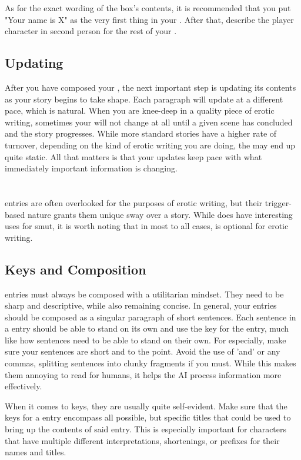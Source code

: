 ﻿\documentclass[Coomer-main.tex]{subfiles}
\begin{document}
As for the exact wording of the \rem box's contents, it is recommended that you put "Your name is X" as the very first thing in your \rem. After that, describe the player character in second person for the rest of your \rem.

\section{Updating}

After you have composed your \rem, the next important step is updating its contents as your story begins to take shape. Each paragraph will update at a different pace, which is natural. When you are knee-deep in a quality piece of erotic writing, sometimes your \rem will not change at all until a given scene has concluded and the story progresses. While more standard stories have a higher rate of \rem turnover, depending on the kind of erotic writing you are doing, the \rem may end up quite static. All that matters is that your updates keep pace with what immediately important information is changing.

\chapter{\wi}

\wi entries are often overlooked for the purposes of erotic writing, but their trigger-based nature grants them unique sway over a story. While \wi does have interesting uses for smut, it is worth noting that in most to all cases, \wi is optional for erotic writing.

\section{Keys and Composition}

\wi entries must always be composed with a utilitarian mindset. They need to be sharp and descriptive, while also remaining concise. In general, your entries should be composed as a singular paragraph of short sentences. Each sentence in a \wi entry should be able to stand on its own and use the key for the entry, much like how \rem sentences need to be able to stand on their own. For \wi especially, make sure your sentences are short and to the point. Avoid the use of 'and' or any commas, splitting sentences into clunky fragments if you must. While this makes them annoying to read for humans, it helps the AI process information more effectively.

When it comes to keys, they are usually quite self-evident. Make sure that the keys for a \wi entry encompass all possible, but specific titles that could be used to bring up the contents of said entry. This is especially important for characters that have multiple different interpretations, shortenings, or prefixes for their names and titles.
\end{document}
